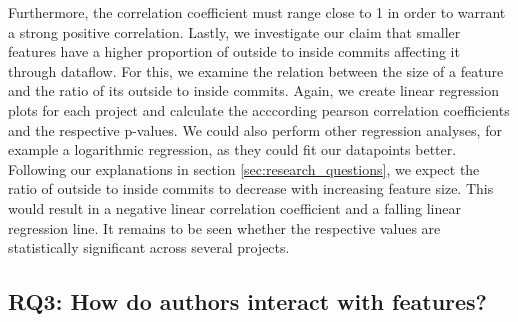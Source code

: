 Furthermore, the correlation coefficient must range close to 1 in order to warrant a strong positive correlation.
Lastly, we investigate our claim that smaller features have a higher proportion of outside to inside commits affecting it through dataflow.
For this, we examine the relation between the size of a feature and the ratio of its outside to inside commits.
Again, we create linear regression plots for each project and calculate the acccording pearson correlation coefficients and the respective p-values.
We could also perform other regression analyses, for example a logarithmic regression, as they could fit our datapoints better.
Following our explanations in section \ref{sec:research_questions}, we expect the ratio of outside to inside commits to decrease with increasing feature size.
This would result in a negative linear correlation coefficient and a falling linear regression line.
It remains to be seen whether the respective values are statistically significant across several projects.

\subsection*{\textbf{RQ3: How do authors interact with features?}}

